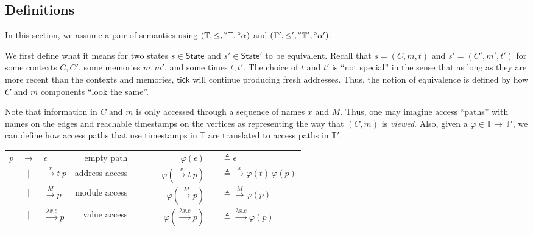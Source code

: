\documentclass[acmsmall,screen,review]{acmart}\settopmatter{printfolios=true,printccs=false,printacmref=false}
\newcommand*{\A}[1]{\prescript{\circ}{}{#1}}
\newcommand*{\Time}{\mathbb{T}}
\newcommand*{\ATime}{\A{\Time}}
\newcommand*{\mem}{m}
\newcommand*{\State}{\mathsf{State}}
\newcommand*{\tick}{\mathsf{tick}}
\begin{document}
\subsection{Definitions}
In this section, we assume a pair of semantics using $(\Time,\le,\ATime,\A\alpha)$ and $(\Time',\le',\ATime',\A\alpha')$.

We first define what it means for two states $s\in\State$ and $s'\in\State'$ to be equivalent.
Recall that $s=(C,\mem,t)$ and $s'=(C',\mem',t')$ for some contexts $C,C'$, some memories $\mem,\mem'$, and some times $t,t'$.
The choice of $t$ and $t'$ is ``not special'' in the sense that as long as they are more recent than the contexts and memories, $\tick$ will continue producing fresh addresses.
Thus, the notion of equivalence is defined by how $C$ and $\mem$ components ``look the same''.

Note that information in $C$ and $\mem$ is only accessed through a sequence of names $x$ and $M$.
Thus, one may imagine access ``paths'' with names on the edges and reachable timestamps on the vertices as representing the way that $(C,\mem)$ is \emph{viewed}.
Also, given a $\varphi\in\Time\rightarrow\Time'$, we can define how access paths that use timestamps in $\Time$ are translated to access paths in $\Time'$.
\begin{center}
  \begin{tabular}{rclrcrcl}
    $p$ & $\rightarrow$ & $\epsilon$                   & empty path     & $\qquad$ & $\varphi(\epsilon)$                   & \hspace{-2em} & $\triangleq\epsilon$                              \\
        & $|$           & $\xrightarrow{x}t\:p$        & address access & $\qquad$ & $\varphi(\xrightarrow{x}t\:p)$        & \hspace{-2em} & $\triangleq\xrightarrow{x}\varphi(t)\:\varphi(p)$ \\
        & $|$           & $\xrightarrow{M}p$           & module access  & $\qquad$ & $\varphi(\xrightarrow{M}p)$           & \hspace{-2em} & $\triangleq\xrightarrow{M}\varphi(p)$             \\
        & $|$           & $\xrightarrow{\lambda x.e}p$ & value access   & $\qquad$ & $\varphi(\xrightarrow{\lambda x.e}p)$ & \hspace{-2em} & $\triangleq\xrightarrow{\lambda x.e}\varphi(p)$
  \end{tabular}
\end{center}
\end{document}
